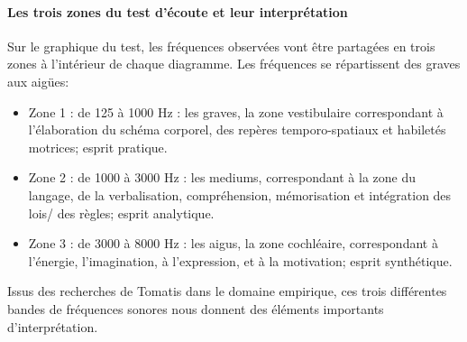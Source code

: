 \paragraph{Les trois zones du test d'écoute et leur interprétation}
Sur le graphique du test, les fréquences observées vont être partagées en
trois zones à l\textquoteright intérieur
de chaque diagramme. Les fréquences se répartissent des
graves aux aigües:
\begin{itemize}
	\item Zone 1 : de 125 à 1000 Hz : les graves, la zone vestibulaire correspondant à l'élaboration
	du schéma corporel, des repères temporo-spatiaux et habiletés motrices; 
	esprit pratique.
	\item Zone 2 : de 1000 à 3000 Hz : les mediums, correspondant à  la zone du langage, de la
	verbalisation, compréhension, %
	mémorisation %
	et intégration des lois/
	des règles; esprit analytique.
	\item Zone 3 : de 3000 à 8000 Hz : les aigus, la zone cochléaire, correspondant à l'énergie,
	 l'imagination, à l'expression, et à la motivation; esprit synthétique.
	
\end{itemize}
 
Issus des recherches de Tomatis dans le domaine
empirique, ces trois différentes bandes de fréquences sonores nous donnent des éléments importants 
d'interprétation.


